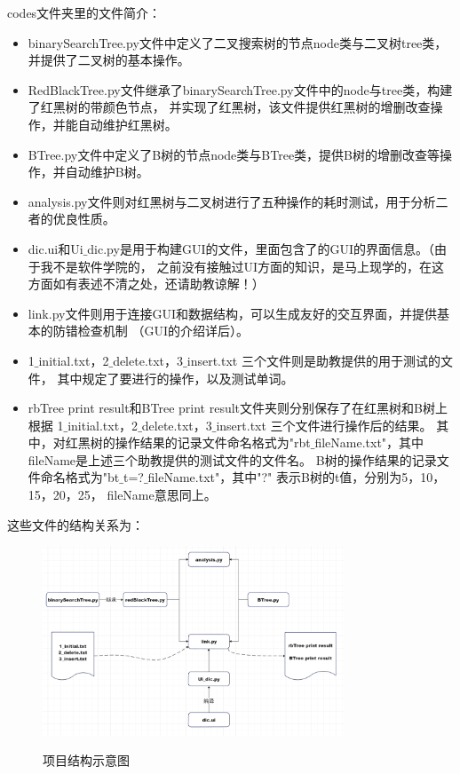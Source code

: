 \documentclass{article}
\begin{document}
codes文件夹里的文件简介：
\begin{itemize}
\item binarySearchTree.py文件中定义了二叉搜索树的节点node类与二叉树tree类，并提供了二叉树的基本操作。
\item RedBlackTree.py文件继承了binarySearchTree.py文件中的node与tree类，构建了红黑树的带颜色节点，
并实现了红黑树，该文件提供红黑树的增删改查操作，并能自动维护红黑树。
\item BTree.py文件中定义了B树的节点node类与BTree类，提供B树的增删改查等操作，并自动维护B树。
\item analysis.py文件则对红黑树与二叉树进行了五种操作的耗时测试，用于分析二者的优良性质。
\item dic.ui和Ui$\_$dic.py是用于构建GUI的文件，里面包含了的GUI的界面信息。（由于我不是软件学院的，
之前没有接触过UI方面的知识，是马上现学的，在这方面如有表述不清之处，还请助教谅解！）
\item link.py文件则用于连接GUI和数据结构，可以生成友好的交互界面，并提供基本的防错检查机制
（GUI的介绍详后）。
\item 1$\_$initial.txt，2$\_$delete.txt，3$\_$insert.txt 三个文件则是助教提供的用于测试的文件，
其中规定了要进行的操作，以及测试单词。
\item rbTree print result和BTree print result文件夹则分别保存了在红黑树和B树上根据
1$\_$initial.txt，2$\_$delete.txt，3$\_$insert.txt  三个文件进行操作后的结果。
其中，对红黑树的操作结果的记录文件命名格式为"rbt$\_$fileName.txt"，其中fileName是上述三个助教提供的测试文件的文件名。
B树的操作结果的记录文件命名格式为"bt$\_$t=?$\_$fileName.txt"，其中"?" 表示B树的t值，分别为5，10，15，20，25，
fileName意思同上。
\end{itemize}

这些文件的结构关系为：
\begin{figure}[H]
	\centering
	{\includegraphics[width=0.8\textwidth]{image//项目结构.png}} 
	\caption{项目结构示意图}
\end{figure}
\end{document}
